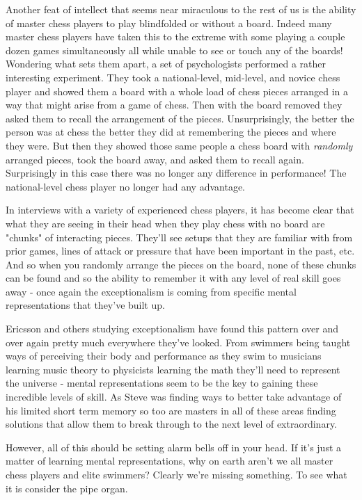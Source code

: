 \documentclass[11pt]{book}
\begin{document}
Another feat of intellect that seems near miraculous to the rest of us is the ability of master chess players to play blindfolded or without a board. Indeed many master chess players have taken this to the extreme with some playing a couple dozen games simultaneously all while unable to see or touch any of the boards! Wondering what sets them apart, a set of psychologists performed a rather interesting experiment. They took a national-level, mid-level, and novice chess player and showed them a board with a whole load of chess pieces arranged in a way that might arise from a game of chess. Then with the board removed they asked them to recall the arrangement of the pieces. Unsurprisingly, the better the person was at chess the better they did at remembering the pieces and where they were. But then they showed those same people a chess board with \textit{randomly} arranged pieces, took the board away, and asked them to recall again. Surprisingly in this case there was no longer any difference in performance! The national-level chess player no longer had any advantage. 
\newline

In interviews with a variety of experienced chess players, it has become clear that what they are seeing in their head when they play chess with no board are "chunks" of interacting pieces. They'll see setups that they are familiar with from prior games, lines of attack or pressure that have been important in the past, etc. And so when you randomly arrange the pieces on the board, none of these chunks can be found and so the ability to remember it with any level of real skill goes away - once again the exceptionalism is coming from specific mental representations that they've built up. 
\newline 

Ericsson and others studying exceptionalism have found this pattern over and over again pretty much everywhere they've looked. From swimmers being taught ways of perceiving their body and performance as they swim to musicians learning music theory to physicists learning the math they'll need to represent the universe - mental representations seem to be the key to gaining these incredible levels of skill. As Steve was finding ways to better take advantage of his limited short term memory so too are masters in all of these areas finding solutions that allow them to break through to the next level of extraordinary. 
\newline

However, all of this should be setting alarm bells off in your head. If it's just a matter of learning mental representations, why on earth aren't we all master chess players and elite swimmers? Clearly we're missing something. To see what it is consider the pipe organ.
\newline
\end{document}
